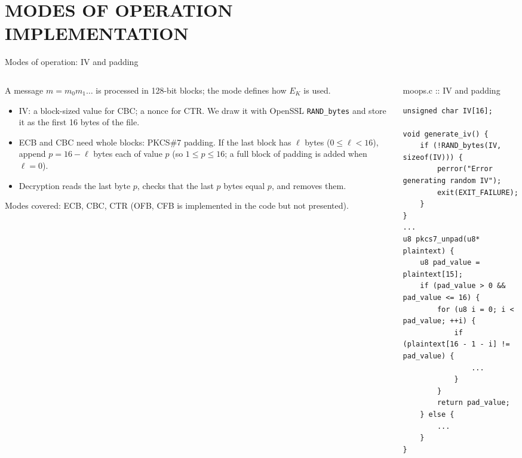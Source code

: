 \documentclass[aspectratio=169,10pt]{beamer}
\newcommand{\codesmall}{\lstset{basicstyle=\ttfamily\fontsize{5.5}{6.4}\selectfont}}
\newcommand{\codenormal}{\lstset{basicstyle=\ttfamily\fontsize{5.9}{6.9}\selectfont}}
\begin{document}
\section{MODES OF OPERATION \\ IMPLEMENTATION}

\begin{frame}[fragile]{Modes of operation: IV and padding}
\begin{columns}[T]
\begin{column}{0.52\textwidth}
\small
A message $m=m_0m_1\dots$ is processed in 128-bit blocks; the mode defines how
$E_K$ is used.
\begin{itemize}\footnotesize
\item \alert{IV}: a block-sized value for CBC; a nonce for CTR.
  We draw it with OpenSSL \texttt{RAND\_bytes} and store it as the first 16 bytes of the file.
\item ECB and CBC need whole blocks: \alert{PKCS\#7 padding}. If the last block has $\ell$ bytes ($0\le\ell<16$), append $p=16-\ell$ bytes each of value $p$ (so $1\le p\le16$; a full block of padding is added when $\ell=0$).
\item Decryption reads the last byte $p$, checks that the last $p$ bytes equal $p$, and removes them.
\end{itemize}
\vskip2pt
{\footnotesize Modes covered: ECB, CBC, CTR (OFB, CFB is implemented in the code but not presented).}
\end{column}
\begin{column}{0.45\textwidth}
\codesmall
\begin{tbox}{moops.c :: IV and padding}
\begin{lstlisting}
unsigned char IV[16];

void generate_iv() {
    if (!RAND_bytes(IV, sizeof(IV))) {
        perror("Error generating random IV");
        exit(EXIT_FAILURE);
    }
}
...
u8 pkcs7_unpad(u8* plaintext) {
    u8 pad_value = plaintext[15];
    if (pad_value > 0 && pad_value <= 16) {
        for (u8 i = 0; i < pad_value; ++i) {
            if (plaintext[16 - 1 - i] != pad_value) {
                ...
            }
        }
        return pad_value;
    } else {
        ...
    }
}
\end{lstlisting}
\end{tbox}
\codenormal
\end{column}
\end{columns}
\end{frame}
\end{document}
